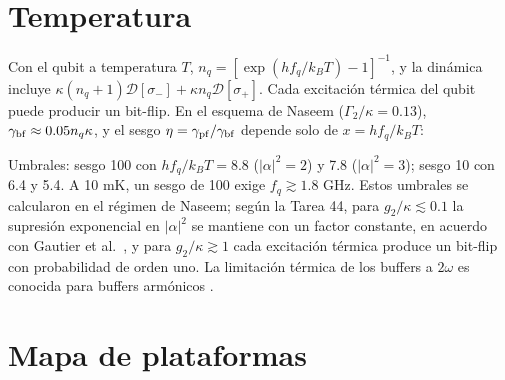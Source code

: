 \documentclass[11pt]{report}
\newcommand{\spl}{\sigma_{+}}
\newcommand{\smi}{\sigma_{-}}
\newcommand{\D}{\mathcal{D}}
\begin{document}
\section{Temperatura}
\label{sec:termico}

Con el qubit a temperatura $T$, $n_{q}=[\exp(hf_{q}/k_{B}T)-1]^{-1}$, y la din\'amica incluye $\kappa(n_{q}+1)\D[\smi]+\kappa n_{q}\D[\spl]$. Cada excitaci\'on t\'ermica del qubit puede producir un bit-flip. En el esquema de Naseem ($\Gamma_{2}/\kappa=0.13$), $\gamma_{\rm bf}\approx0.05n_{q}\kappa$, y el sesgo $\eta=\gamma_{\rm pf}/\gamma_{\rm bf}$ depende solo de $x=hf_{q}/k_{B}T$:

\begin{center}
\end{center}

Umbrales: sesgo 100 con $hf_{q}/k_{B}T=8.8$ ($|\alpha|^{2}=2$) y 7.8 ($|\alpha|^{2}=3$); sesgo 10 con 6.4 y 5.4. A 10 mK, un sesgo de 100 exige $f_{q}\gtrsim1.8$ GHz. Estos umbrales se calcularon en el r\'egimen de Naseem; seg\'un la Tarea 44, para $g_{2}/\kappa\lesssim0.1$ la supresi\'on exponencial en $|\alpha|^{2}$ se mantiene con un factor constante, en acuerdo con Gautier et al.\ \cite{Gautier2022}, y para $g_{2}/\kappa\gtrsim1$ cada excitaci\'on t\'ermica produce un bit-flip con probabilidad de orden uno. La limitaci\'on t\'ermica de los buffers a $2\omega$ es conocida para buffers arm\'onicos \cite{Marquet2024}.

\section{Mapa de plataformas}
\end{document}
